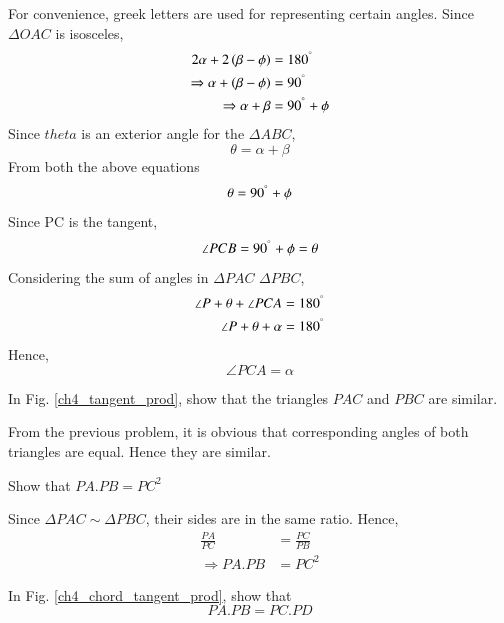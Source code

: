 %
\proof For convenience, greek letters are used for representing certain angles. Since $\Delta OAC$ is isosceles,
%
\begin{align}
2 \alpha + 2 \left(\beta - \phi\right) &= 180^{\degree} \\
\Rightarrow  \alpha +  \left(\beta - \phi\right) &= 90^{\degree} \\
\Rightarrow  \alpha +  \beta  &= 90^{\degree} + \phi
\end{align}
%
Since $theta$ is an exterior angle for the $\Delta ABC
$,
%
\begin{equation}
\theta = \alpha + \beta
\end{equation}
%
From both the above equations
%
\begin{equation}
\theta = 90^{\degree} + \phi
\end{equation}
%
Since PC is the tangent, 
%
\begin{equation}
\angle PCB = 90^{\degree} + \phi = \theta
\end{equation}
%
Considering the sum of angles in $\Delta PAC$ $\Delta PBC$,
%
\begin{align}
\angle P + \theta + \angle PCA &= 180^{\degree} \\
\angle P + \theta + \alpha &= 180^{\degree}
\end{align}
Hence,
%
\begin{equation}
\angle PCA = \alpha
\end{equation}
%
\begin{problem}
	In Fig. \ref{ch4_tangent_prod}, show that the triangles $PAC$ and $PBC$ are similar.
\end{problem}
\proof From the previous problem, it is obvious that corresponding angles of both triangles are equal.  Hence they are similar.
%
\begin{problem}
	Show that $PA.PB = PC^2$
\end{problem}
\proof Since $\Delta PAC \sim \Delta PBC$, their sides are in the same ratio.  Hence,
%
\begin{align}
\frac{PA}{PC} &= \frac{PC}{PB} \\
\Rightarrow PA.PB &=PC^2
\end{align}
%
%
\begin{problem}
	In Fig. \ref{ch4_chord_tangent_prod}, show that\begin{equation}
	PA.PB = PC.PD
	\end{equation}
\end{problem}
%

